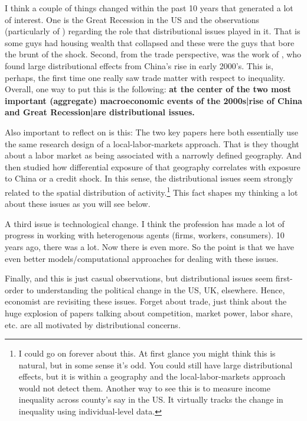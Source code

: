 \documentclass[pdftex,12pt]{article}
\begin{document}
\medskip
\noindent I think a couple of things changed within the past 10 years that generated a lot of interest. One is the Great Recession in the US and the observations (particularly of \citet{mian2014explains}) regarding the role that distributional issues played in it. That is some guys had housing wealth that collapsed and these were the guys that bore the brunt of the shock. Second, from the trade perspective, was the work of \citet{david2013china}, who found large distributional effects from China's rise in early 2000's. This is, perhaps, the first time one really saw trade matter with respect to inequality. Overall, one way to put this is the following: \textbf{at the center of the two most important (aggregate) macroeconomic events of the 2000s|rise of China and Great Recession|are distributional issues.}

\medskip
\noindent Also important to reflect on is this: The two key papers here both essentially use the same research design of a local-labor-markets approach. That is they thought about a labor market as being associated with a narrowly defined geography. And then studied how differential exposure of that geography correlates with exposure to China or a credit shock. In this sense, the distributional issues seem strongly related to the spatial distribution of activity.\footnote{I could go on forever about this. At first glance you might think this is natural, but in some sense it's odd. You could still have large distributional effects, but it is within a geography and the local-labor-markets approach would not detect them. Another way to see this is to measure income inequality across county's say in the US. It virtually tracks the change in inequality using individual-level data.} This fact shapes my thinking a lot about these issues as you will see below.

\medskip
\noindent A third issue is technological change. I think the profession has made a lot of progress in working with heterogenous agents (firms, workers, consumers). 10 years ago, there was a lot. Now there is even more. So the point is that we have even better models/computational approaches for dealing with these issues.

\medskip
\noindent Finally, and this is just casual observations, but distributional issues seem first-order to understanding the political change in the US, UK, elsewhere. Hence, economist are revisiting these issues. Forget about trade, just think about the huge explosion of papers talking about competition, market power, labor share, etc. are all motivated by distributional concerns.
\end{document}
